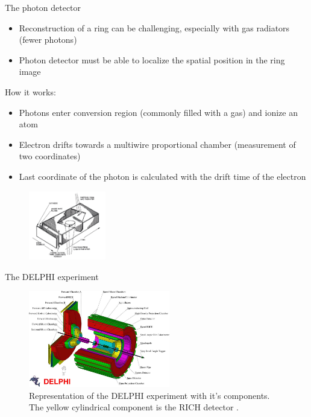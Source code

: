 \documentclass[aspectratio=1610, 10pt]{beamer}
\begin{document}
\begin{frame}{The photon detector}
  \begin{itemize}
    \item Reconstruction of a ring can be challenging, especially with gas radiators (fewer photons)
    \medskip
    \item Photon detector must be able to localize the spatial position in the ring image
  \end{itemize}
How it works:
\begin{itemize}
  \item Photons enter conversion region (commonly filled with a gas) and ionize an atom
  \medskip
  \item Electron drifts towards a multiwire proportional chamber (measurement of two coordinates)
  \medskip
  \item Last coordinate of the photon is calculated with the drift time of the electron
\end{itemize}
  \begin{figure}
    \includegraphics[width=0.3\textwidth]{images/photon_det.png}
  \end{figure}
\end{frame}

\begin{frame}{The DELPHI experiment}
  \begin{figure}
    \includegraphics[width=0.55\textwidth]{images/delphi.jpg}
    \caption{Representation of the DELPHI experiment with it's components. The yellow cylindrical component is the RICH detector \cite{delphi}.}
  \end{figure}
\end{frame}
\end{document}
